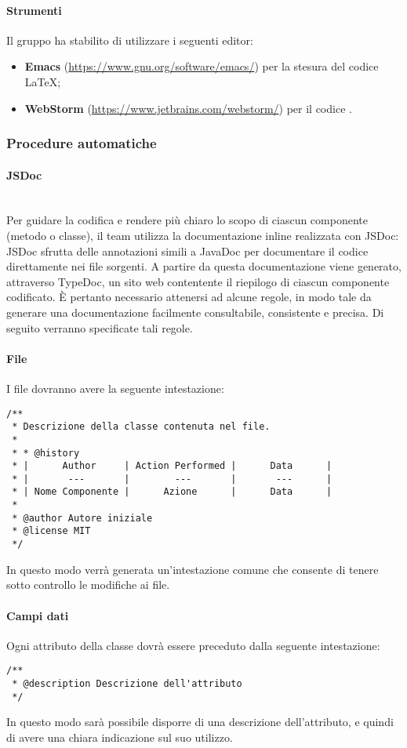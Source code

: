                 \paragraph*{Strumenti}
                Il gruppo ha stabilito di utilizzare i seguenti editor:
                \begin{itemize}
                  \item \textbf{Emacs} (\url{https://www.gnu.org/software/emacs/}) per la stesura del codice \LaTeX; 
                  \item \textbf{WebStorm} (\url{https://www.jetbrains.com/webstorm/}) per il codice .
                \end{itemize}
             
\subsubsection{Procedure automatiche}
\paragraph{JSDoc} \mbox{} \\
Per guidare la codifica e rendere più chiaro lo scopo di ciascun componente (metodo o classe), il team utilizza la documentazione inline realizzata con JSDoc: JSDoc sfrutta delle annotazioni simili a JavaDoc per documentare il codice direttamente nei file sorgenti. A partire da questa documentazione viene generato, attraverso TypeDoc, un sito web contentente il riepilogo di ciascun componente codificato. È pertanto necessario attenersi ad alcune regole, in modo tale da generare una documentazione facilmente consultabile, consistente e precisa. Di seguito verranno specificate tali regole.
\paragraph*{File}
I file dovranno avere la seguente intestazione:
\begin{verbatim}
/**
 * Descrizione della classe contenuta nel file.
 *
 * * @history
 * |      Author     | Action Performed |      Data      |
 * |       ---       |        ---       |       ---      |
 * | Nome Componente |      Azione      |      Data	     |
 *
 * @author Autore iniziale
 * @license MIT
 */
\end{verbatim}
In questo modo verrà generata un'intestazione comune che consente di tenere sotto controllo le modifiche ai file.
\paragraph*{Campi dati}
Ogni attributo della classe dovrà essere preceduto dalla seguente intestazione:
\begin{verbatim}
/**
 * @description Descrizione dell'attributo
 */
\end{verbatim}
In questo modo sarà possibile disporre di una descrizione dell'attributo, e quindi di avere una chiara indicazione sul suo utilizzo.
